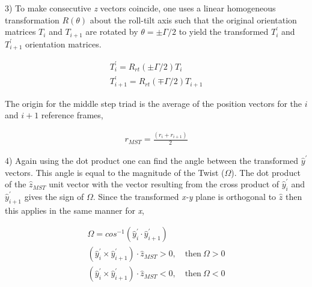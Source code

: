 3) To make consecutive \textit{z}  vectors coincide, one uses a linear
homogeneous transformation  $R(\theta)$ about the  roll-tilt axis such
that the original orientation matrices $T_i$ and $T_{i+1}$ are rotated
by $ \theta  = \pm \Gamma / 2$ to yield  the transformed $T_i^{'}$ and
$T_{i+1}^{'}$ orientation matrices.

\begin{gather}
T_i^{'} = R_{rt}(\pm \Gamma/2) T_{i} \\
T_{i+1}^{'} = R_{rt}(\mp \Gamma/2) T_{i+1}
\end{gather}

The origin  for the middle step  triad is the average  of the position
vectors for the $i$ and $i+1$ reference frames,

\begin{gather}
r_{MST} = \frac{(r_i + r_{i+1})} {2}
\end{gather}

4) Again  using the  dot product  one can find  the angle  between the
transformed  $\hat{y}^{'}$  vectors.   This  angle  is  equal  to  the
magnitude  of   the  Twist  ($\Omega$).    The  dot  product   of  the
$\hat{z}_{MST}$ unit  vector with the vector resulting  from the cross
product of $\hat{y}_{i}^{'}$ and $\hat{y}_{i+1}^{'}$ gives the sign of
$\Omega$. Since  the transformed  \textit{x-y} plane is  orthogonal to
$\hat{z}$ then this applies in the same manner for \textit{x},

\begin{gather}
\Omega = cos^{-1}(\hat{y}_{i}^{'} \cdot \hat{y}_{i+1}^{'})\\
(\hat{y}_{i}^{'} \times \hat{y}_{i+1}^{'}) \cdot \hat{z}_{MST} > 0, \quad \textrm{then} \ \Omega > 0\\
(\hat{y}_{i}^{'} \times \hat{y}_{i+1}^{'}) \cdot \hat{z}_{MST} < 0, \quad \textrm{then} \ \Omega < 0
\end{gather}


